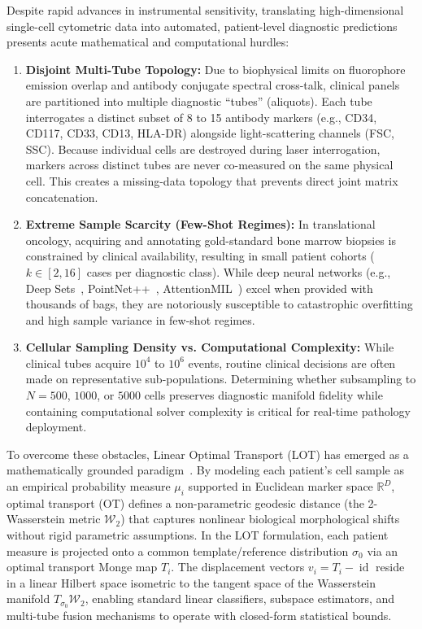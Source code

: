 \documentclass[10pt,journal,compsoc]{IEEEtran}
\begin{document}
Despite rapid advances in instrumental sensitivity, translating high-dimensional single-cell cytometric data into automated, patient-level diagnostic predictions presents acute mathematical and computational hurdles:
\begin{enumerate}
    \item \textbf{Disjoint Multi-Tube Topology:} Due to biophysical limits on fluorophore emission overlap and antibody conjugate spectral cross-talk, clinical panels are partitioned into multiple diagnostic ``tubes'' (aliquots). Each tube interrogates a distinct subset of 8 to 15 antibody markers (e.g., CD34, CD117, CD33, CD13, HLA-DR) alongside light-scattering channels (FSC, SSC). Because individual cells are destroyed during laser interrogation, markers across distinct tubes are never co-measured on the same physical cell. This creates a missing-data topology that prevents direct joint matrix concatenation.
    \item \textbf{Extreme Sample Scarcity (Few-Shot Regimes):} In translational oncology, acquiring and annotating gold-standard bone marrow biopsies is constrained by clinical availability, resulting in small patient cohorts ($k \in [2, 16]$ cases per diagnostic class). While deep neural networks (e.g., Deep Sets~\cite{zaheer2017deep}, PointNet++~\cite{qi2017pointnetplus}, AttentionMIL~\cite{ilse2018attention}) excel when provided with thousands of bags, they are notoriously susceptible to catastrophic overfitting and high sample variance in few-shot regimes.
    \item \textbf{Cellular Sampling Density vs. Computational Complexity:} While clinical tubes acquire $10^4$ to $10^6$ events, routine clinical decisions are often made on representative sub-populations. Determining whether subsampling to $N=500$, $1000$, or $5000$ cells preserves diagnostic manifold fidelity while containing computational solver complexity is critical for real-time pathology deployment.
\end{enumerate}

To overcome these obstacles, Linear Optimal Transport (LOT) has emerged as a mathematically grounded paradigm~\cite{wang2013linear,kolouri2017optimal}. By modeling each patient's cell sample as an empirical probability measure $\mu_i$ supported in Euclidean marker space $\mathbb{R}^D$, optimal transport (OT) defines a non-parametric geodesic distance (the 2-Wasserstein metric $\mathcal{W}_2$) that captures nonlinear biological morphological shifts without rigid parametric assumptions. In the LOT formulation, each patient measure is projected onto a common template/reference distribution $\sigma_0$ via an optimal transport Monge map $T_i$. The displacement vectors $v_i = T_i - \operatorname{id}$ reside in a linear Hilbert space isometric to the tangent space of the Wasserstein manifold $T_{\sigma_0}\mathcal{W}_2$, enabling standard linear classifiers, subspace estimators, and multi-tube fusion mechanisms to operate with closed-form statistical bounds.
\end{document}
